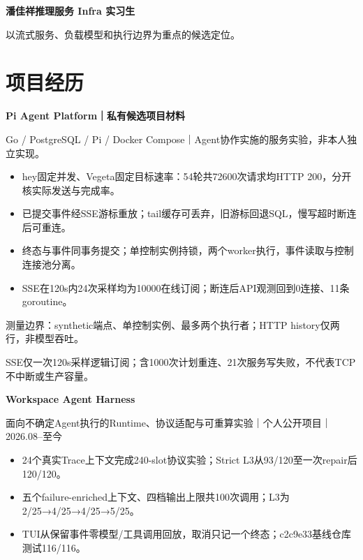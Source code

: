 \documentclass[10pt,a4paper,UTF8,fontset=fandol]{ctexart}
\begin{document}
\fontsize{9.5}{12.0}\selectfont
{\fontsize{23.5}{26}\selectfont\bfseries 潘佳祥}\hfill {\color{navy}\bfseries 推理服务 Infra 实习生}
\par{}
\par{}
\par\vspace{0.3em}以流式服务、负载模型和执行边界为重点的候选定位。
\section{项目经历}
{\bfseries\color{navy}Pi Agent Platform｜私有候选项目材料}\par
{\color{muted}\fontsize{8.8}{10.8}\selectfont Go / PostgreSQL / Pi / Docker Compose｜Agent协作实施的服务实验，非本人独立实现。}\par
\begin{itemize}
\item hey固定并发、Vegeta固定目标速率：54轮共72600次请求均HTTP 200，分开核实际发送与完成率。
\item 已提交事件经SSE游标重放；tail缓存可丢弃，旧游标回退SQL，慢写超时断连后可重连。
\item 终态与事件同事务提交；单控制实例持锁，两个worker执行，事件读取与控制连接池分离。
\item SSE在120s内24次采样均为10000在线订阅；断连后API观测回到0连接、11条goroutine。
\end{itemize}
{\color{muted}\fontsize{8.5}{10.4}\selectfont 测量边界：synthetic端点、单控制实例、最多两个执行者；HTTP history仅两行，非模型吞吐。\par}
{\color{muted}\fontsize{8.5}{10.4}\selectfont SSE仅一次120s采样逻辑订阅；含1000次计划重连、21次服务写失败，不代表TCP不中断或生产容量。\par}
\vspace{0.6em}
{\bfseries\color{navy}Workspace Agent Harness}\par
{\color{muted}\fontsize{8.8}{10.8}\selectfont 面向不确定Agent执行的Runtime、协议适配与可重算实验｜个人公开项目｜2026.08--至今}\par
\begin{itemize}
\item 24个真实Trace上下文完成240-slot协议实验；Strict L3从93/120至一次repair后120/120。
\item 五个failure-enriched上下文、四档输出上限共100次调用；L3为2/25→4/25→4/25→5/25。
\item TUI从保留事件零模型/工具调用回放，取消只记一个终态；c2c9e33基线仓库测试116/116。
\end{itemize}
\end{document}

